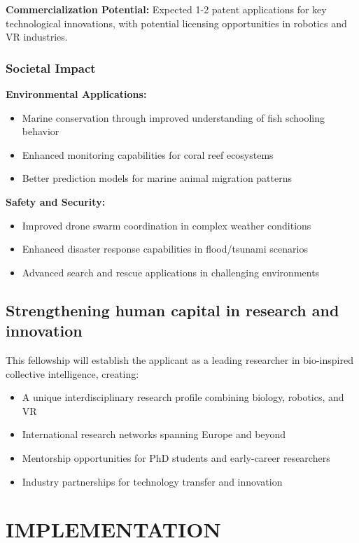 \documentclass[11pt,a4paper]{article}
\newcommand{\highlight}[1]{\textbf{\color{blue!70!black} #1}}
\begin{document}
\highlight{Commercialization Potential:}
Expected 1-2 patent applications for key technological innovations, with potential licensing opportunities in robotics and VR industries.

\subsubsection{Societal Impact}

\highlight{Environmental Applications:}
\begin{itemize}[noitemsep]
\item Marine conservation through improved understanding of fish schooling behavior
\item Enhanced monitoring capabilities for coral reef ecosystems
\item Better prediction models for marine animal migration patterns
\end{itemize}

\highlight{Safety and Security:}
\begin{itemize}[noitemsep]
\item Improved drone swarm coordination in complex weather conditions
\item Enhanced disaster response capabilities in flood/tsunami scenarios
\item Advanced search and rescue applications in challenging environments
\end{itemize}

\subsection{Strengthening human capital in research and innovation}

This fellowship will establish the applicant as a leading researcher in bio-inspired collective intelligence, creating:
\begin{itemize}[noitemsep]
\item A unique interdisciplinary research profile combining biology, robotics, and VR
\item International research networks spanning Europe and beyond
\item Mentorship opportunities for PhD students and early-career researchers
\item Industry partnerships for technology transfer and innovation
\end{itemize}

\section{IMPLEMENTATION}
\end{document}
